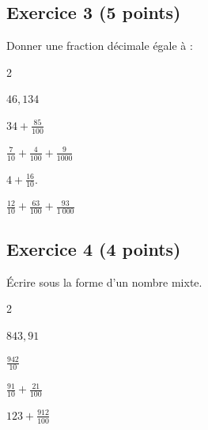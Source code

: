 \documentclass[14 pt]{extarticle}
\theoremstyle{plain}
\begin{document}
  \subsection*{Exercice 3 (5 points)}
  Donner une fraction décimale égale à : 
  \begin{enumerate} \begin{multicols}{2}
  \item $\displaystyle46,134$
  \item $\displaystyle34+ \frac{85}{100}$
  \item $\displaystyle\frac{7}{10} + \frac4{100} + \frac{9}{1000}$
  \item $\displaystyle4 + \frac{16}{10}$. 
  \item $\displaystyle\frac{12}{10}+\frac{63}{100}+ \frac{93}{1~000}$
  \end{multicols}
  \end{enumerate}
  
  \subsection*{Exercice 4 (4 points)}
Écrire sous la forme d'un nombre mixte. 
\begin{enumerate} \begin{multicols}{2}
\item $\displaystyle843,91$
\item $\displaystyle\frac{942}{10}$
\item $\displaystyle\frac{91}{10}+\frac{21}{100}$
\item $\displaystyle123 + \frac{912}{100}$
\end{multicols}
\end{enumerate}

 	
\end{document}
